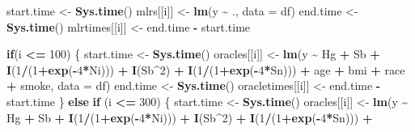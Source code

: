 \documentclass[12pt, twoside]{amherstthesis}
\newenvironment{Shaded}{\begin{snugshade}}{\end{snugshade}}
\newcommand{\AttributeTok}[1]{\textcolor[rgb]{0.13,0.29,0.53}{#1}}
\newcommand{\ControlFlowTok}[1]{\textcolor[rgb]{0.13,0.29,0.53}{\textbf{#1}}}
\newcommand{\DecValTok}[1]{\textcolor[rgb]{0.00,0.00,0.81}{#1}}
\newcommand{\FunctionTok}[1]{\textcolor[rgb]{0.13,0.29,0.53}{\textbf{#1}}}
\newcommand{\NormalTok}[1]{#1}
\newcommand{\OtherTok}[1]{\textcolor[rgb]{0.56,0.35,0.01}{#1}}
\newcommand{\SpecialCharTok}[1]{\textcolor[rgb]{0.81,0.36,0.00}{\textbf{#1}}}
\begin{document}
\begin{Shaded}
\begin{Highlighting}[]
\NormalTok{    start.time }\OtherTok{\textless{}{-}} \FunctionTok{Sys.time}\NormalTok{()}
\NormalTok{    mlrs[[i]] }\OtherTok{\textless{}{-}} \FunctionTok{lm}\NormalTok{(y }\SpecialCharTok{\textasciitilde{}}\NormalTok{ ., }\AttributeTok{data =}\NormalTok{ df)}
\NormalTok{    end.time }\OtherTok{\textless{}{-}} \FunctionTok{Sys.time}\NormalTok{()}
\NormalTok{    mlrtimes[[i]] }\OtherTok{\textless{}{-}}\NormalTok{ end.time }\SpecialCharTok{{-}}\NormalTok{ start.time}
    
    \ControlFlowTok{if}\NormalTok{(i }\SpecialCharTok{\textless{}=} \DecValTok{100}\NormalTok{) \{}
\NormalTok{      start.time }\OtherTok{\textless{}{-}} \FunctionTok{Sys.time}\NormalTok{()}
\NormalTok{      oracles[[i]] }\OtherTok{\textless{}{-}} \FunctionTok{lm}\NormalTok{(y }\SpecialCharTok{\textasciitilde{}}\NormalTok{ Hg }\SpecialCharTok{+}\NormalTok{ Sb }\SpecialCharTok{+}
                           \FunctionTok{I}\NormalTok{(}\DecValTok{1}\SpecialCharTok{/}\NormalTok{(}\DecValTok{1}\SpecialCharTok{+}\FunctionTok{exp}\NormalTok{(}\SpecialCharTok{{-}}\DecValTok{4}\SpecialCharTok{*}\NormalTok{Ni))) }\SpecialCharTok{+} \FunctionTok{I}\NormalTok{(Sb}\SpecialCharTok{\^{}}\DecValTok{2}\NormalTok{) }\SpecialCharTok{+} \FunctionTok{I}\NormalTok{(}\DecValTok{1}\SpecialCharTok{/}\NormalTok{(}\DecValTok{1}\SpecialCharTok{+}\FunctionTok{exp}\NormalTok{(}\SpecialCharTok{{-}}\DecValTok{4}\SpecialCharTok{*}\NormalTok{Sn))) }\SpecialCharTok{+}
\NormalTok{                           age }\SpecialCharTok{+}\NormalTok{ bmi }\SpecialCharTok{+}\NormalTok{ race }\SpecialCharTok{+}\NormalTok{ smoke, }\AttributeTok{data =}\NormalTok{ df)}
\NormalTok{      end.time }\OtherTok{\textless{}{-}} \FunctionTok{Sys.time}\NormalTok{()}
\NormalTok{      oracletimes[[i]] }\OtherTok{\textless{}{-}}\NormalTok{ end.time }\SpecialCharTok{{-}}\NormalTok{ start.time}
\NormalTok{    \} }\ControlFlowTok{else} \ControlFlowTok{if}\NormalTok{ (i }\SpecialCharTok{\textless{}=} \DecValTok{300}\NormalTok{) \{}
\NormalTok{      start.time }\OtherTok{\textless{}{-}} \FunctionTok{Sys.time}\NormalTok{()}
\NormalTok{      oracles[[i]] }\OtherTok{\textless{}{-}} \FunctionTok{lm}\NormalTok{(y }\SpecialCharTok{\textasciitilde{}}\NormalTok{ Hg }\SpecialCharTok{+}\NormalTok{ Sb }\SpecialCharTok{+}
                           \FunctionTok{I}\NormalTok{(}\DecValTok{1}\SpecialCharTok{/}\NormalTok{(}\DecValTok{1}\SpecialCharTok{+}\FunctionTok{exp}\NormalTok{(}\SpecialCharTok{{-}}\DecValTok{4}\SpecialCharTok{*}\NormalTok{Ni))) }\SpecialCharTok{+} \FunctionTok{I}\NormalTok{(Sb}\SpecialCharTok{\^{}}\DecValTok{2}\NormalTok{) }\SpecialCharTok{+} \FunctionTok{I}\NormalTok{(}\DecValTok{1}\SpecialCharTok{/}\NormalTok{(}\DecValTok{1}\SpecialCharTok{+}\FunctionTok{exp}\NormalTok{(}\SpecialCharTok{{-}}\DecValTok{4}\SpecialCharTok{*}\NormalTok{Sn))) }\SpecialCharTok{+}

\end{Highlighting}
\end{Shaded}
\end{document}
